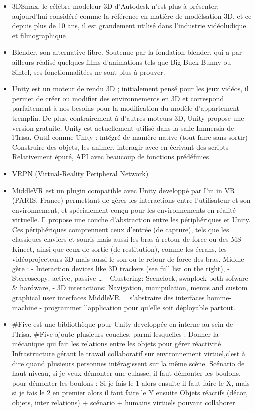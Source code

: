 	\begin{itemize}
		\item 3DSmax, le célèbre modeleur 3D d’Autodesk n’est plus à présenter; aujourd’hui considéré comme la référence en matière de modélsation 3D, et ce depuis plus de 10 ans, il est grandement utilisé dans l’industrie vidéoludique et filmographique
		\item Blender, son alternative libre. Soutenue par la fondation blender, qui a par ailleurs réalisé quelques films d’animations tels que Big Buck Bunny ou Sintel, ses fonctionnalitées ne sont plus à prouver.
		\item Unity est un moteur de rendu 3D ; initialement pensé pour les jeux vidéos, il permet de créer ou modifier des environnements en 3D et correspond parfaitement à nos besoins pour la modification du modèle d’appartement tremplin. De plus, contrairement à d’autres moteurs 3D, Unity propose une version gratuite. Unity est actuellement utilisé dans la salle Immersia de l’Irisa.      
			Outil comme Unity : intégré de manière native (tout faire sans sortir)
			Construire des objets, les animer, interagir avec en écrivant des scripts
			Relativement épuré, API avec beaucoup de fonctions prédéfinies


		\item VRPN (Virtual-Reality Peripheral Network)
		
		\item MiddleVR est un plugin compatible avec Unity developpé par I’m in VR (PARIS, France) permettant de gérer les interactions entre l’utilisateur et son environnement, et spécialement conçu pour les environnements en réalité virtuelle. Il propose une couche d’abstraction entre les périphériques et Unity. Ces périphériques comprennent ceux d’entrée (de capture), tels que les classiques claviers et souris mais aussi les bras à retour de force ou des MS Kinect, ainsi que ceux de sortie (de restitution), comme les écrans, les vidéoprojecteurs 3D mais aussi le son ou le retour de force des bras. Middle gère :
		- Interaction devices like 3D trackers (see full list on the right),
		- Stereoscopy: active, passive …
		- Clustering: Scenelock, swaplock both sofware & hardware,
		- 3D interactions: Navigation, manipulation, menus and custom graphical user interfaces
		MiddleVR = s'abstraire des interfaces homme-machine - programmer l'application pour qu'elle soit déployable partout.

		\item #Five est une bibliothèque pour Unity developpée en interne au sein de l’Irisa. #Five ajoute plusieurs couches, parmi lesquelles : 
		Donner la mécanique qui fait les relations entre les objets pour gérer réactivité
		Infrastructure gérant le travail collaboratif sur environnement virtuel,c’est à dire quand plusieurs personnes intéragissent sur la même scène.
		Scénario de haut niveau, si je veux démonter une culasse, il faut démonter les boulons, pour démonter les boulons : Si je fais le 1 alors ensuite il faut faire le X, mais si je fais le 2 en premier alors il faut faire le Y ensuite
		Objets réactifs (décor, objets, inter relations) + scénario + humains virtuels pouvant collaborer
	\end{itemize}

